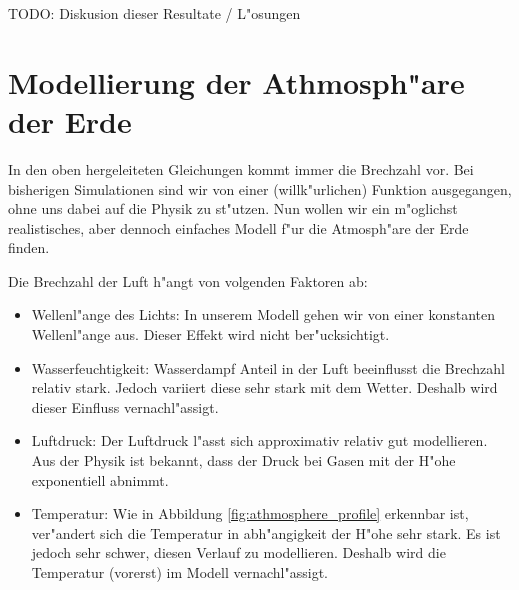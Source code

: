 \begin{refsection}
TODO: Diskusion dieser Resultate / L"osungen

\section{Modellierung der Athmosph"are der Erde}

In den oben hergeleiteten Gleichungen kommt immer die Brechzahl vor. 
Bei bisherigen Simulationen sind wir von einer (willk"urlichen) Funktion ausgegangen, ohne uns dabei auf die Physik zu st"utzen. 
Nun wollen wir ein m"oglichst realistisches, aber dennoch einfaches Modell f"ur die Atmosph"are der Erde finden.

Die Brechzahl der Luft h"angt von volgenden Faktoren ab:
\begin{itemize}
  \item Wellenl"ange des Lichts: In unserem Modell gehen wir von einer konstanten Wellenl"ange aus. Dieser Effekt wird nicht ber"ucksichtigt.
  \item Wasserfeuchtigkeit: Wasserdampf Anteil in der Luft beeinflusst die Brechzahl relativ stark. Jedoch variiert diese sehr stark mit dem Wetter. Deshalb wird dieser Einfluss vernachl"assigt. 
  \item Luftdruck: Der Luftdruck l"asst sich approximativ relativ gut modellieren. Aus der Physik ist bekannt, dass der Druck bei Gasen mit der H"ohe exponentiell abnimmt. 
  \item Temperatur: Wie in Abbildung \ref{fig:athmosphere_profile} erkennbar ist, ver"andert sich die Temperatur in abh"angigkeit der H"ohe sehr stark. Es ist jedoch sehr schwer, diesen Verlauf zu modellieren. Deshalb wird die Temperatur (vorerst) im Modell vernachl"assigt.
\end{itemize}


\end{refsection}
